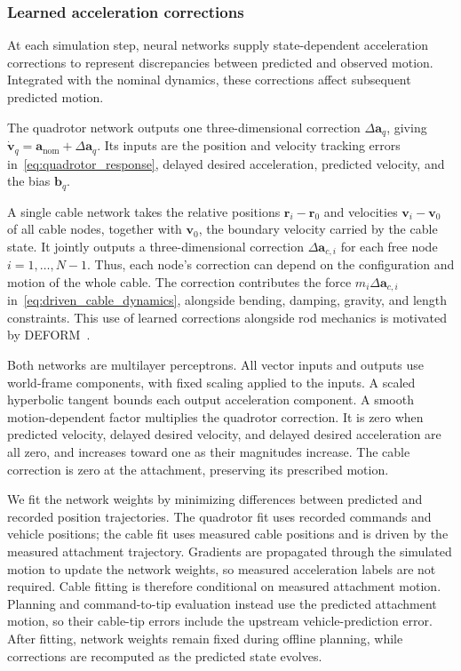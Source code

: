\documentclass[letterpaper, 10 pt, conference]{ieeeconf}
\begin{document}
\subsubsection{Learned acceleration corrections}
At each simulation step, neural networks supply state-dependent
acceleration corrections to represent discrepancies between
predicted and observed motion. Integrated with the nominal
dynamics, these corrections affect subsequent predicted motion.

The quadrotor network outputs one three-dimensional correction
$\Delta\mathbf{a}_q$, giving
$\dot{\mathbf{v}}_q=\mathbf{a}_{\mathrm{nom}}
+\Delta\mathbf{a}_q$.
Its inputs are the position and velocity tracking errors
in~\eqref{eq:quadrotor_response}, delayed desired acceleration,
predicted velocity, and the bias $\mathbf{b}_q$.

A single cable network takes the relative positions
$\mathbf r_i-\mathbf r_0$ and velocities $\mathbf v_i-\mathbf v_0$
of all cable nodes, together with $\mathbf v_0$, the boundary
velocity carried by the cable state. It jointly outputs a
three-dimensional correction $\Delta\mathbf{a}_{c,i}$ for each free node
$i=1,\ldots,N-1$. Thus, each node's correction can depend on
the configuration and motion of the whole cable.
The correction contributes the force
$m_i\Delta\mathbf{a}_{c,i}$
in~\eqref{eq:driven_cable_dynamics}, alongside bending,
damping, gravity, and length constraints.
This use of learned corrections alongside rod mechanics
is motivated by DEFORM~\cite{pmlr-v270-chen25d}.

Both networks are multilayer perceptrons. All vector inputs
and outputs use world-frame components, with fixed scaling
applied to the inputs. A scaled hyperbolic tangent bounds
each output acceleration component.
A smooth motion-dependent factor multiplies the quadrotor
correction. It is zero when predicted velocity, delayed desired
velocity, and delayed desired acceleration are all zero,
and increases toward one as their magnitudes increase.
The cable correction is zero at the attachment,
preserving its prescribed motion.

We fit the network weights by minimizing differences between
predicted and recorded position trajectories. The quadrotor fit
uses recorded commands and vehicle positions; the cable fit uses
measured cable positions
and is driven by the measured attachment trajectory.
Gradients are propagated through the simulated motion to
update the network weights, so measured acceleration labels
are not required.
Cable fitting is therefore conditional on measured attachment
motion. Planning and command-to-tip evaluation instead use the
predicted attachment motion, so their cable-tip errors include
the upstream vehicle-prediction error. After fitting, network
weights remain fixed during offline planning, while corrections
are recomputed as the predicted state evolves.
\end{document}
